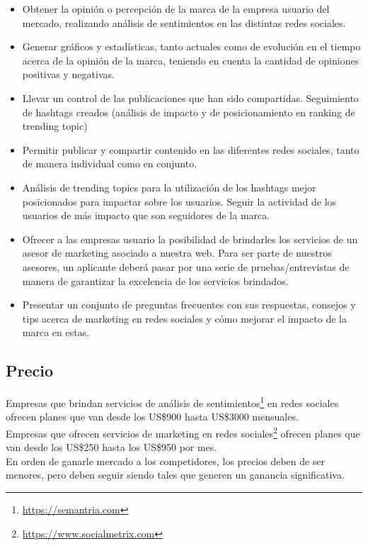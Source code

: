 \documentclass[oneside]{book}
\begin{document}
\begin{itemize}
\item Obtener la opinión o percepción de la marca de la empresa usuario del mercado, realizando an\'{a}lisis de sentimientos en las distintas redes sociales.

\item Generar gráficos y estad\'{i}sticas, tanto actuales como de evoluci\'{o}n en el tiempo acerca de la opini\'{o}n de la marca, teniendo en cuenta la cantidad de opiniones positivas y negativas.

\item Llevar un control de las publicaciones que han sido compartidas.
Seguimiento de hashtags creados (an\'{a}lisis de impacto y de posicionamiento en ranking de trending topic)

\item Permitir publicar y compartir contenido en las diferentes redes sociales, tanto de manera individual como en conjunto. 

\item Análisis de trending topics para la utilización de los hashtags mejor posicionados para impactar sobre los usuarios.
Seguir la actividad de los usuarios de más impacto que son seguidores de la marca. 

\item Ofrecer a las empresas usuario la posibilidad de brindarles los servicios de un asesor de marketing asociado a nuestra web. Para ser parte de nuestros asesores, un aplicante deber\'{a} pasar por una serie de pruebas/entrevistas de manera de garantizar la excelencia de los servicios brindados. 

\item Presentar un conjunto de preguntas frecuentes con sus respuestas, consejos y tips acerca de marketing en redes sociales y cómo mejorar el impacto de la marca en estas.


\end{itemize}


	
\subsection{Precio}
Empresas que brindan servicios de análisis de sentimientos\footnote{\url{https://semantria.com}} en redes sociales ofrecen planes que van desde los US\$900 hasta US\$3000 mensuales. \\
Empresas que ofrecen servicios de marketing en redes sociales\footnote{\url{https://www.socialmetrix.com}} ofrecen planes que van desde los US\$250 hasta los US\$950 por mes.\\
En orden de ganarle mercado a los competidores, los precios deben de ser menores, pero deben seguir siendo tales que generen un ganancia significativa. 
\end{document}
